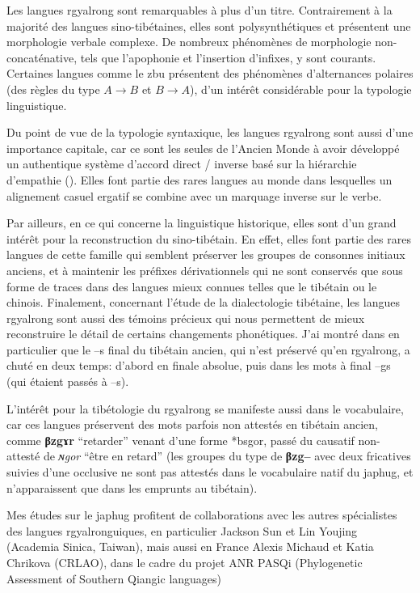 \documentclass[oldfontcommands,oneside,a4paper,11pt]{memoir}
\newcommand{\ipa}[1]{{\phon\textbf{#1}}}
\begin{document}
Les langues rgyalrong sont remarquables à plus d’un titre. Contrairement à la majorité des langues sino-tibétaines, elles sont polysynthétiques et présentent une morphologie verbale complexe. De nombreux phénomènes de morphologie non-concaténative, tels que l’apophonie et l’insertion d’infixes, y sont courants. Certaines langues comme le zbu présentent des phénomènes d'alternances polaires (des règles du type $A \rightarrow B$ et $B \rightarrow A$), d'un intérêt considérable pour la typologie linguistique.


Du point de vue de la typologie syntaxique, les langues rgyalrong sont aussi d’une importance capitale, car ce sont les seules de l’Ancien Monde à avoir développé un authentique système d’accord direct / inverse basé sur la hiérarchie d’empathie (\citealt{jacques10inverse}). Elles font partie des rares langues au monde dans lesquelles un alignement casuel ergatif se combine avec un marquage inverse sur le verbe.


Par ailleurs, en ce qui concerne la linguistique historique, elles sont d’un grand intérêt pour la reconstruction du sino-tibétain. En effet, elles font partie des rares langues de cette famille qui semblent préserver les groupes de consonnes initiaux anciens, et à maintenir les préfixes dérivationnels qui ne sont conservés que sous forme de traces dans des langues mieux connues telles que le tibétain ou le chinois. Finalement, concernant l’étude de la dialectologie tibétaine, les langues rgyalrong sont aussi des témoins précieux qui nous permettent de mieux reconstruire le détail de certains changements phonétiques. J'ai montré dans \citet{jacques06s} en particulier que le --s final du tibétain ancien, qui n'est préservé qu'en rgyalrong, a chuté en deux temps: d'abord en finale absolue, puis dans les mots à final --gs (qui étaient passés à --s).

L'intérêt pour la tibétologie du rgyalrong se manifeste aussi dans le vocabulaire, car ces langues préservent des mots parfois non attestés en tibétain ancien, comme \ipa{βzgɤr} ``retarder'' venant d'une forme *bsgor, passé du causatif non-attesté de \textit{ɴgor} ``être en retard'' (les groupes du type de \ipa{βzg--} avec deux fricatives suivies d'une occlusive ne sont pas attestés dans le vocabulaire natif du japhug, et n'apparaissent que dans les emprunts au tibétain).

Mes études sur le japhug profitent de collaborations avec les autres spécialistes des langues rgyalronguiques, en particulier Jackson Sun et Lin Youjing (Academia Sinica, Taiwan), mais  aussi en France Alexis Michaud et Katia Chrikova (CRLAO), dans le cadre du projet ANR PASQi (Phylogenetic Assessment of Southern Qiangic languages) 
\end{document}
